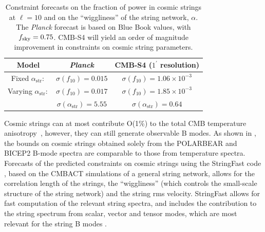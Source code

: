 \begin{table}[htbp!]\label{tab:string_forecast}
  \begin{center}
    \begin{tabular}{ | c || c | c  |}
      \hline
       Model & {\it Planck} & CMB-S4 ($1^\prime$ resolution)  \\ \hline \hline
       Fixed $\alpha_\mathrm{str}:$ & $\sigma(f_{10})= 0.015$ & $\sigma(f_{10})=1.06\times 10^{-3}$  \\ \hline
       Varying $\alpha_\mathrm{str}:$ & $\sigma(f_{10})= 0.017$ & $\sigma(f_{10})=1.85\times 10^{-3}$ \\
        & $\sigma(\alpha_\mathrm{str})= 5.55$ & $\sigma(\alpha_\mathrm{str})=0.64$ \\\hline
    \end{tabular}
  \end{center}
  \caption{Constraint forecasts on the fraction of power in cosmic strings at $\ell=10$ and on the ``wiggliness'' of the string network, $\alpha$. The {\it Planck\/} forecast is based on Blue Book values, with $f_{\rm sky} = 0.75$. CMB-S4 will yield an order of magnitude improvement in constraints on cosmic string parameters.}
\end{table}

Cosmic strings can at most contribute O(1\%) to the total CMB temperature anisotropy~\cite{Ade:2013xla,Lizarraga:2014xza,Lazanu:2014eya}, however, they can still generate observable B modes. As shown in \cite{Moss:2014cra}, the bounds on cosmic strings obtained solely from the POLARBEAR \cite{Ade:2014afa} and BICEP2  \cite{Ade:2014xna} B-mode spectra are comparable to those from temperature spectra. 
Forecasts of the predicted constraints on cosmic strings using the StringFast code \cite{Foreman:2011uj}, based on the CMBACT simulations \cite{Pogosian:1999np} of a general string network, allows for the correlation length of the strings, the ``wiggliness'' (which controls the small-scale structure of the string network) and the string rms velocity. StringFast allows for fast computation of the relevant string spectra, and includes the contribution to the string spectrum from scalar, vector and tensor modes, which are most relevant for the string B modes \cite{Foreman:2011uj}.

